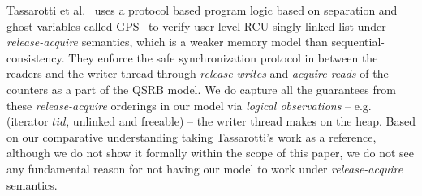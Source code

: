  Tassarotti et al.~\cite{verrcu} uses a protocol based program logic based on separation and ghost variables called \textsf{GPS}~\cite{Turon:2014:GNW:2660193.2660243} to verify user-level \textsf{RCU} singly linked list under \emph{release-acquire} semantics, which is a weaker memory model than sequential-consistency. They enforce the safe synchronization protocol in between the readers and the writer thread through \textit{release-writes} and \textit{acquire-reads} of the counters as a part of the QSRB model. We do capture all the guarantees from these \textit{release-acquire} orderings in our model via \textit{logical observations} -- e.g. (\textsf{iterator} $tid$, \textsf{unlinked} and \textsf{freeable}) -- the writer thread makes on the heap. Based on our comparative understanding taking Tassarotti's work as a reference, although we do not show it formally within the scope of this paper, we do not see any fundamental reason for not having our model to work under \textit{release-acquire} semantics.

